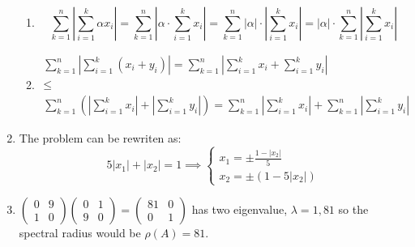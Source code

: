 \documentclass{article}
\newcommand*{\mat}[1]{\begin{pmatrix}#1\end{pmatrix}}
\begin{document}
\begin{enumerate}
{\begin{enumerate}[label={\text{property }\arabic*}]
{                    \begin{displaymath}
                        \sum_{k=1}^n\left|\sum_{i=1}^k x_i\right| = 0 \Longleftrightarrow
                        x_i = 0 \ \forall i
                    \end{displaymath}
                }
                \item {
                    \begin{displaymath}
                        \sum_{k=1}^n\left|\sum_{i=1}^k \alpha x_i\right| = 
                        \sum_{k=1}^n\left|\alpha\cdot\sum_{i=1}^k x_i\right| = 
                        \sum_{k=1}^n|\alpha|\cdot\left|\sum_{i=1}^k x_i\right| = 
                        |\alpha|\cdot\sum_{k=1}^n\left|\sum_{i=1}^k x_i\right|
                    \end{displaymath}
                }
                \item {
                    \begin{gather*}
                        \sum_{k=1}^n\left|\sum_{i=1}^k(x_i+y_i)\right| = 
                        \sum_{k=1}^n\left|\sum_{i=1}^k x_i+ \sum_{i=1}^ky_i\right| \\ \leq \\
                        \sum_{k=1}^n\left(\left|\sum_{i=1}^k x_i\right| + \left|\sum_{i=1}^ky_i\right|\right) =
                        \sum_{k=1}^n\left|\sum_{i=1}^k x_i\right| + \sum_{k=1}^n\left|\sum_{i=1}^ky_i\right|
                    \end{gather*}
                }
            \end{enumerate}
        }
        \item {
            The problem can be rewriten as:
            \begin{displaymath}
                5|x_1| + |x_2| = 1 \implies \begin{cases}
                    x_1 = \pm\frac{1 - |x_2|}{5} \\
                    x_2 = \pm(1 - 5|x_2|)
                \end{cases}
            \end{displaymath}
        }
        \item {
            \(\mat{0 & 9 \\ 1 & 0}\mat{0 & 1 \\ 9 & 0} = \mat{81 & 0 \\ 0 & 1}\) has two eigenvalue, 
            \(\lambda = 1, 81\) so the spectral radius would be \(\rho(A) = 81\).
            \begin{itemize}

\end{itemize}}
\end{enumerate}
\end{document}
